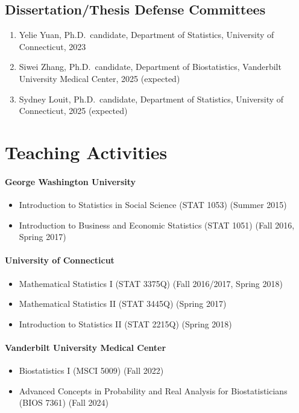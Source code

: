 \documentclass[12pt]{article}
\begin{document}
	\subsection*{Dissertation/Thesis Defense Committees}
	\begin{enumerate}
		\item Yelie Yuan, Ph.D.\ candidate, Department of 
		Statistics, University of Connecticut, 2023
		\item Siwei Zhang, Ph.D.\ candidate, Department of 
		Biostatistics, Vanderbilt University Medical Center, 2025 
		(expected)
		\item Sydney Louit, Ph.D.\ candidate, Department of 
		Statistics, University of Connecticut, 2025 (expected)
	\end{enumerate}
	
	
	\section*{Teaching Activities}
	\paragraph{George Washington University}
	\begin{itemize}
		\item Introduction to Statistics in Social Science (STAT 
		1053) (Summer 2015)
		\item Introduction to Business and Economic Statistics 
		(STAT 1051) (Fall 2016, Spring 2017)
	\end{itemize}
	\paragraph{University of Connecticut}
	\begin{itemize}
		\item Mathematical Statistics {\rm I} (STAT 3375Q) (Fall 
		2016/2017, Spring 2018)
		\item Mathematical Statistics {\rm II} (STAT 3445Q) (Spring 
		2017)
		\item Introduction to Statistics {\rm II} (STAT 2215Q) 
		(Spring 2018)
	\end{itemize}
	\paragraph{Vanderbilt University Medical Center}
	\begin{itemize}
		\item Biostatistics {\rm I} (MSCI 5009) (Fall 2022)
		\item Advanced Concepts in Probability and Real Analysis for 
		Biostatisticians (BIOS 7361) (Fall 2024)
	\end{itemize}
\end{document}
